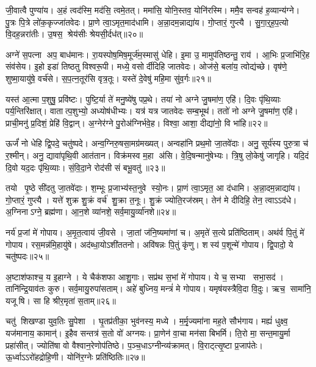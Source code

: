 जी॒वात्वै पुण्या॑य। अ॒हं त्वद॑स्मि॒ मद॑सि॒ त्वमे॒तत्। ममा॑सि॒ योनि॒स्तव॒ योनि॑रस्मि। ममै॒व सन्वह॑ ह॒व्यान्य॑ग्ने। पु॒त्रः पि॒त्रे लो॑क॒कृज्जा॑तवेदः। प्रा॒णे त्वा॒ऽमृत॒माद॑धामि। अ॒न्ना॒दम॒न्नाद्या॑य। गो॒प्तारं॒ गुप्त्यै। सु॒गा॒र्॒ह॒प॒त्यो वि॒दह॒न्नरा॑तीः। उ॒षस॒ श्रेय॑सीः श्रेयसी॒र्दध॑त्॥२०॥

अग्ने॑ स॒पत्ना अप॒ बाध॑मानः। रा॒यस्पोष॒मिष॒मूर्ज॑म॒स्मासु॑ धेहि। इ॒मा उ॒ मामुप॑तिष्ठन्तु॒ राय॑। आ॒भिः प्र॒जाभि॑रि॒ह संव॑सेय। इ॒हो इडा॑ तिष्ठतु विश्वरू॒पी। मध्ये॒ वसोर्दीदिहि जातवेदः। ओज॑से॒ बला॑य॒ त्वोद्य॑च्छे। वृष॑णे॒ शुष्मा॒यायु॑षे॒ वर्च॑से। स॒प॒त्न॒तूर॑सि वृत्र॒तूः। यस्ते॑ दे॒वेषु॑ महि॒मा सु॑व॒र्गः॥२१॥

यस्त॑ आ॒त्मा प॒शुषु॒ प्रवि॑ष्टः। पुष्टि॒र्या ते॑ मनु॒ष्ये॑षु पप्र॒थे। तया॑ नो अग्ने जु॒षमा॑ण॒ एहि॑। दि॒वः पृ॑थि॒व्याः पर्य॒न्तिरि॑क्षात्। वातात्प॒शुभ्यो॒ अध्योष॑धीभ्यः। यत्र॑ यत्र जातवेदः सम्ब॒भूथ॑। ततो॑ नो अग्ने जु॒षमा॑ण॒ एहि॑। प्राची॒मनु॑ प्र॒दिशं॒ प्रेहि॑ वि॒द्वान्। अ॒ग्नेर॑ग्ने पु॒रोअ॑ग्निर्भवे॒ह। विश्वा॒ आशा॒ दीद्या॑नो॒ वि भा॑हि॥२२॥

ऊर्जं॑ नो धेहि द्वि॒पदे॒ चतु॑ष्पदे। अन्व॒ग्निरु॒षसा॒मग्र॑मख्यत्। अन्वहा॑नि प्रथ॒मो जा॒तवे॑दाः। अनु॒ सूर्य॑स्य पुरु॒त्रा च॑ र॒श्मीन्। अनु॒ द्यावा॑पृथि॒वी आत॑तान। विक्र॑मस्व म॒हा अ॑सि। वे॒दि॒षन्मानु॑षेभ्यः। त्रि॒षु लो॒केषु॑ जागृहि। यदि॒दं दि॒वो यद॒दः पृ॑थि॒व्याः। सं॒वि॒दा॒ने रोद॑सी सं बभू॒वतु॑॥२३॥

तयो पृ॒ष्ठे सी॑दतु जा॒तवे॑दाः। श॒म्भूः प्र॒जाभ्य॑स्त॒नुवे स्यो॒नः। प्रा॒णं त्वा॒ऽमृत॒ आ द॑धामि। अ॒न्ना॒दम॒न्नाद्या॑य। गो॒प्तारं॒ गुप्त्यै। यत्ते॑ शुक्र शु॒क्रं वर्च॑ शु॒क्रा त॒नूः। शु॒क्रं ज्योति॒रज॑स्रम्। तेन॑ मे दीदिहि॒ तेन॒ त्वाऽऽद॑धे। अ॒ग्निनाऽग्ने॒ ब्रह्म॑णा। आ॒न॒शे व्या॑नशे॒ सर्व॒मायु॒र्व्या॑नशे॥२४॥

नर्य॑ प्र॒जां मे॑ गोपाय। अ॒मृ॒त॒त्वाय॑ जी॒वसे। जा॒तां ज॑नि॒ष्यमा॑णां च। अ॒मृते॑ स॒त्ये प्रति॑ष्ठिताम्। अथ॑र्व पि॒तुं मे॑ गोपाय। रस॒मन्न॑मि॒हायु॑षे। अद॑ब्धा॒योऽशी॑ततनो। अवि॑षन्नः पि॒तुं कृ॑णु। शस्य॑ प॒शून्मे॑ गोपाय। द्वि॒पादो॒ ये चतु॑ष्पदः॥२५॥

अ॒ष्टाश॑फाश्च॒ य इ॒हाग्ने। ये चैक॑शफा आशु॒गाः। सप्र॑थ स॒भां मे॑ गोपाय। ये च॒ सभ्या सभा॒सद॑। तानि॑न्द्रि॒याव॑तः कुरु। सर्व॒मायु॒रुपा॑सताम्। अहे॑ बुध्निय॒ मन्त्रं॑ मे गोपाय। यमृष॑यस्त्रैवि॒दा वि॒दुः। ऋच॒ सामा॑नि॒ यजूषि। सा हि श्रीर॒मृता॑ स॒ताम्॥२६॥

चतु॑ शिखण्डा युव॒तिः सु॒पेशा। घृ॒तप्र॑तीका॒ भुव॑नस्य॒ मध्ये। म॒र्मृ॒ज्यमा॑ना मह॒ते सौभ॑गाय। मह्यं॑ धुक्ष्व॒ यज॑मानाय॒ कामान्॑। इ॒हैव सन्तत्र॑ स॒तो वो॑ अग्नयः। प्रा॒णेन॑ वा॒चा मन॑सा बिभर्मि। ति॒रो मा॒ सन्त॒मायु॒र्मा प्रहा॑सीत्। ज्योति॑षा वो वैश्वान॒रेणोप॑तिष्ठे। प॒ञ्च॒धाऽग्नीन्व्य॑क्रामत्। वि॒राट्त्सृ॒ष्टा प्र॒जाप॑तेः। ऊ॒र्ध्वाऽऽरो॑हद्रोहि॒णी। योनि॑र॒ग्नेः प्रति॑ष्ठितिः॥२७॥\anuvakamend[वि॒श॒न्तु॒ न॒ पु॒रू॒चीर्वि॑धेम नि॒धाय॒ यत्तेऽप्र॑दाहाय बृह॒त्यो ब्रह्म॑णा दुवस्यत वि॒श्ववा॑र इ॒ममृ॑ञ्जते पुरो॒गां प्रज॑नयि॒ष्यथो॑ जनि॒ष्यतेऽस्मै॒ मम॑ महि॒म्ना वर्च॑से॒ दध॑त्सुव॒र्गो भा॑हि सम्बभू॒वतु॒रायु॒र्व्या॑नशे॒ चतु॑ष्सदः स॒तां प्र॒जाप॑ते॒र्द्वे च॑]

